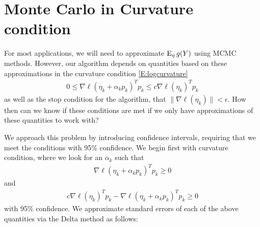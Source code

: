 

\section{Monte Carlo in Curvature condition}
For most applications, we will need to approximate $\operatorname{E}_{\eta}g(Y)$ using MCMC methods.  However, our algorithm depends on quantities based on these approximations in the curvature condition \eqref{E:logcurvature}
\begin{align*}
	 0 \leq  \nabla \ell( \eta_k + \alpha_k p_k)^T p_k \leq c \nabla \ell(\eta_k)^T p_k
\end{align*}
as well as the stop condition for the algorithm, that $\parallel \nabla \ell( \eta_k ) \parallel < \epsilon$.  How then can we know if these conditions are met if we only have approximations of these quantities to work with?

We approach this problem by introducing confidence intervals, requiring that we meet the conditions with 95\% confidence.  We begin first with curvature condition, where we look for an $\alpha_k$ such that 
\begin{align}
\nabla \ell( \eta_k + \alpha_k p_k)^T p_k \geq 0 \label{E:curveL}
\end{align}
and
\begin{align}
	c \nabla \ell(\eta_k)^T p_k - \nabla \ell( \eta_k + \alpha_k p_k)^T p_k \geq 0 \label{E:curveR}
\end{align}
with 95\% confidence.  We approximate standard errors of each of the above quantities via the Delta method as follows:


